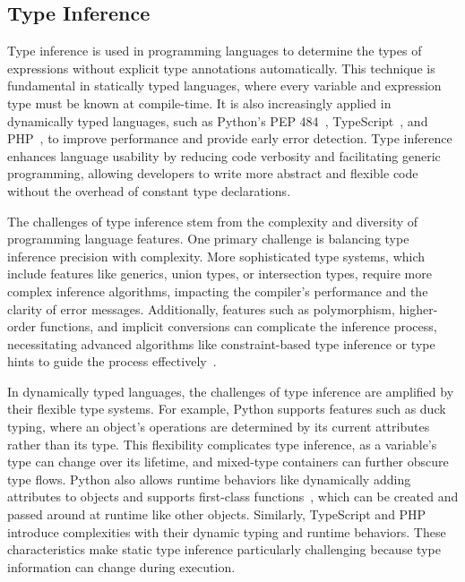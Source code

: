 \subsection{Type Inference}
Type inference is used in programming languages to determine the types of expressions without explicit type annotations automatically. This technique is fundamental in statically typed languages, where every variable and expression type must be known at compile-time. It is also increasingly applied in dynamically typed languages, such as Python's PEP 484~\cite{van2014pep}, TypeScript~\cite{bierman2014understanding}, and PHP~\cite{phptd}, to improve performance and provide early error detection. Type inference enhances language usability by reducing code verbosity and facilitating generic programming, allowing developers to write more abstract and flexible code without the overhead of constant type declarations.

The challenges of type inference stem from the complexity and diversity of programming language features. One primary challenge is balancing type inference precision with complexity. More sophisticated type systems, which include features like generics, union types, or intersection types, require more complex inference algorithms, impacting the compiler's performance and the clarity of error messages. Additionally, features such as polymorphism, higher-order functions, and implicit conversions can complicate the inference process, necessitating advanced algorithms like constraint-based type inference or type hints to guide the process effectively~\cite{agesen1995cartesian}.

In dynamically typed languages, the challenges of type inference are amplified by their flexible type systems. For example, Python supports features such as duck typing, where an object's operations are determined by its current attributes rather than its type. This flexibility complicates type inference, as a variable's type can change over its lifetime, and mixed-type containers can further obscure type flows. Python also allows runtime behaviors like dynamically adding attributes to objects and supports first-class functions~\cite{peng2021empirical}, which can be created and passed around at runtime like other objects. Similarly, TypeScript and PHP introduce complexities with their dynamic typing and runtime behaviors. These characteristics make static type inference particularly challenging because type information can change during execution.

